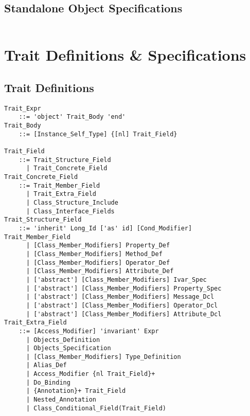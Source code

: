 \subsection{Standalone Object Specifications}
\label{sec:standalone-object-specs}

\grammar\begin{lstlisting}

\end{lstlisting}






\section{Trait Definitions \& Specifications}
\label{sec:trait-defs-specs}

\subsection{Trait Definitions}
\label{sec:trait-defs}

\grammar\begin{lstlisting}
Trait_Expr
    ::= 'object' Trait_Body 'end'
Trait_Body
    ::= [Instance_Self_Type] {[nl] Trait_Field}

Trait_Field
    ::= Trait_Structure_Field
      | Trait_Concrete_Field
Trait_Concrete_Field
    ::= Trait_Member_Field
      | Trait_Extra_Field
      | Class_Structure_Include
      | Class_Interface_Fields
Trait_Structure_Field
    ::= 'inherit' Long_Id ['as' id] [Cond_Modifier]
Trait_Member_Field
      | [Class_Member_Modifiers] Property_Def
      | [Class_Member_Modifiers] Method_Def
      | [Class_Member_Modifiers] Operator_Def
      | [Class_Member_Modifiers] Attribute_Def
      | ['abstract'] [Class_Member_Modifiers] Ivar_Spec
      | ['abstract'] [Class_Member_Modifiers] Property_Spec
      | ['abstract'] [Class_Member_Modifiers] Message_Dcl
      | ['abstract'] [Class_Member_Modifiers] Operator_Dcl
      | ['abstract'] [Class_Member_Modifiers] Attribute_Dcl
Trait_Extra_Field
    ::= [Access_Modifier] 'invariant' Expr
      | Objects_Definition
      | Objects_Specification
      | [Class_Member_Modifiers] Type_Definition
      | Alias_Def
      | Access_Modifier {nl Trait_Field}+
      | Do_Binding
      | {Annotation}+ Trait_Field
      | Nested_Annotation
      | Class_Conditional_Field(Trait_Field)
\end{lstlisting}






